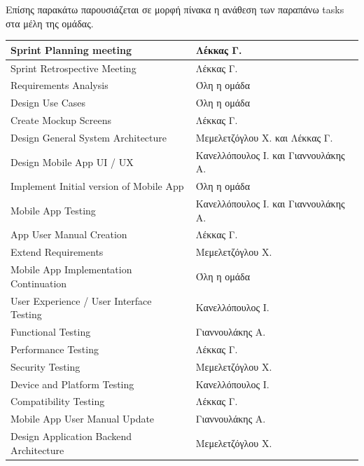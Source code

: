 \documentclass{../ol-softwaremanual}
\begin{document}
	\vspace{20pt}
	\flushleft	
	Επίσης παρακάτω παρουσιάζεται σε μορφή πίνακα η ανάθεση των παραπάνω  \en tasks \gr στα μέλη της ομάδας.	
	
	
	\begin{longtable}{| p{} | p{} |} 
		\hline
		\en Sprint Planning meeting \gr & Λέκκας Γ. \\ 
		\hline
		\en Sprint Retrospective Meeting \gr & Λέκκας Γ.    \\ 
		\hline
		\en Requirements Analysis \gr & Όλη η ομάδα    \\ 
		\hline
		\en Design Use Cases \gr    &      Όλη η ομάδα     \\
		\hline
		\en Create Mockup Screens  \gr      &   Λέκκας Γ.        \\
		\hline
		\en Design General System Architecture \gr       &  Μεμελετζόγλου Χ. και Λέκκας Γ.         \\
		\hline
		\en Design Mobile App UI / UX \gr       &  Κανελλόπουλος Ι. και Γιαννουλάκης Α.         \\
		\hline
		\en Implement Initial version of Mobile App \gr       &  Όλη η ομάδα         \\
		\hline
		\en Mobile App Testing \gr       &  Κανελλόπουλος Ι. και Γιαννουλάκης Α.         \\
		\hline
		\en App User Manual Creation \gr       &  Λέκκας Γ.         \\
		\hline
		\en Extend Requirements \gr       &  Μεμελετζόγλου Χ.         \\
		\hline
		\en Mobile App Implementation Continuation \gr       &  Όλη η ομάδα         \\
		\hline
		\en User Experience / User Interface Testing \gr       &  Κανελλόπουλος Ι.         \\
		\hline
		\en Functional Testing \gr       &  Γιαννουλάκης Α.         \\
		\hline
		\en Performance Testing \gr       &  Λέκκας Γ.         \\
		\hline
		\en Security Testing \gr       &  Μεμελετζόγλου Χ.         \\
		\hline
		\en Device and Platform Testing \gr       &  Κανελλόπουλος Ι.         \\
		\hline
		\en Compatibility Testing \gr       &  Λέκκας Γ.         \\
		\hline
		\en Mobile App User Manual Update \gr       &  Γιαννουλάκης Α.         \\
		\hline
		\en Design Application Backend Architecture \gr       & Μεμελετζόγλου Χ.         \\

\end{longtable}
\end{document}
